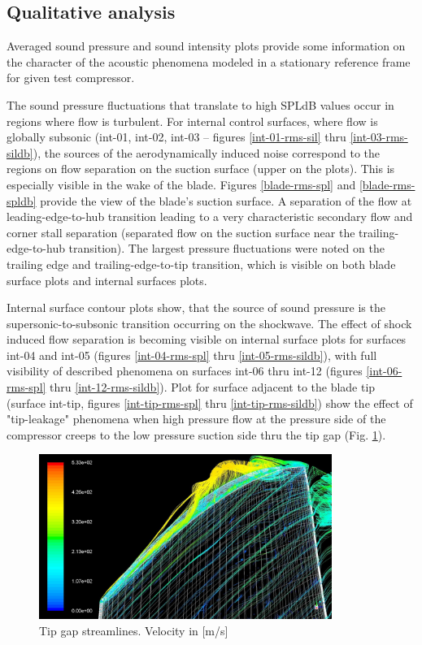 \subsection{Qualitative analysis} \label{rms_res_qual}
Averaged sound pressure and sound intensity plots provide some information on the character of the acoustic phenomena modeled in a stationary reference frame for given test compressor.

The sound pressure fluctuations that translate to high SPLdB values occur in regions where flow is turbulent. For internal control surfaces, where flow is globally subsonic (int-01, int-02, int-03 -- figures \ref{int-01-rms-sil} thru \ref{int-03-rms-sildb}), the sources of the aerodynamically induced noise correspond to the regions on flow separation on the suction surface (upper on the plots). This is especially visible in the wake of the blade. Figures \ref{blade-rms-spl} and \ref{blade-rms-spldb} provide the view of the blade's suction surface. A separation of the flow at leading-edge-to-hub transition leading to a very characteristic secondary flow and corner stall separation (separated flow on the suction surface near the trailing-edge-to-hub transition). The largest pressure fluctuations were noted on the trailing edge and trailing-edge-to-tip transition, which is visible on both blade surface plots and internal surfaces plots.

Internal surface contour plots show, that the source of sound pressure is the supersonic-to-subsonic transition occurring on the shockwave. The effect of shock induced flow separation is becoming visible on internal surface plots for surfaces int-04 and int-05 (figures \ref{int-04-rms-spl} thru \ref{int-05-rms-sildb}), with full visibility of described phenomena on surfaces int-06 thru int-12 (figures \ref{int-06-rms-spl} thru \ref{int-12-rms-sildb}). Plot for surface adjacent to the blade tip (surface int-tip, figures \ref{int-tip-rms-spl} thru \ref{int-tip-rms-sildb}) show the effect of "tip-leakage" phenomena when high pressure flow at the pressure side of the compressor creeps to the low pressure suction side thru the tip gap (Fig. \ref{tip_stream}). 

\begin{figure}[h!]
\centering %
\includegraphics[width=0.85\textwidth]{Pictures/tip_stream.jpg}
\caption{Tip gap streamlines. Velocity in [m/s]}
\label{tip_stream}
\end{figure}

